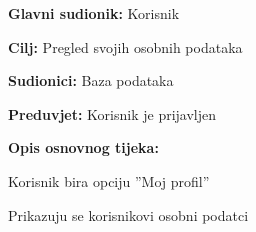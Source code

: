 					\noindent {}
					\begin{packed_item}
	
						\item \textbf{Glavni sudionik: }  Korisnik
						\item  \textbf{Cilj:} Pregled svojih osobnih podataka
						\item  \textbf{Sudionici:} Baza podataka
						\item  \textbf{Preduvjet:} Korisnik je prijavljen
						\item  \textbf{Opis osnovnog tijeka:} 
						
						
						\item[] \begin{packed_enum}
	
							\item Korisnik bira opciju ”Moj profil”				
							\item Prikazuju se korisnikovi osobni podatci
							
						\end{packed_enum}
					\end{packed_item}

